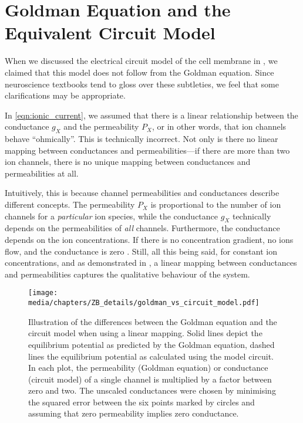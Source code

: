 
\section{Goldman Equation and the Equivalent Circuit Model}
\label{app:goldman_equiv_circuit_diff}

When we discussed the electrical circuit model of the cell membrane in , we claimed that this model does not follow from the Goldman equation.
Since neuroscience textbooks tend to gloss over these subtleties, we feel that some clarifications may be appropriate.

In \cref{eqn:ionic_current}, we assumed that there is a linear relationship between the conductance $g_X$ and the permeability $P_X$, or in other words, that ion channels behave \enquote{ohmically}.
This is technically incorrect.
Not only is there no linear mapping between conductances and permeabilities---if there are more than two ion channels, there is no unique mapping between conductances and permeabilities at all.

Intuitively, this is because channel permeabilities and conductances describe different concepts.
The permeability $P_X$ is proportional to the number of ion channels for a \emph{particular} ion species, while the conductance $g_X$ technically depends on the permeabilities of \emph{all} channels.
Furthermore, the conductance depends on the ion concentrations.
If there is no concentration gradient, no ions flow, and the conductance is zero \citep{enderle2011bioelectric}.
Still, all this being said, for constant ion concentrations, and as demonstrated in , a linear mapping between conductances and permeabilities captures the qualitative behaviour of the system.

\begin{figure}
	\centering
	\texttt{[image: media/chapters/ZB\_details/goldman\_vs\_circuit\_model.pdf]}
	\caption[Differences between the Goldman equation and the circuit model]{Illustration of the differences between the Goldman equation and the circuit model when using a linear mapping. Solid lines depict the equilibrium potential as predicted by the Goldman equation, dashed lines the equilibrium potential as calculated using the model circuit. In each plot, the permeability (Goldman equation) or conductance (circuit model) of a single channel is multiplied by a factor between zero and two. The unscaled conductances were chosen by minimising the squared error between the six points marked by circles and assuming that zero permeability implies zero conductance.}
	\label{fig:goldman_vs_circuit_model}
\end{figure}

